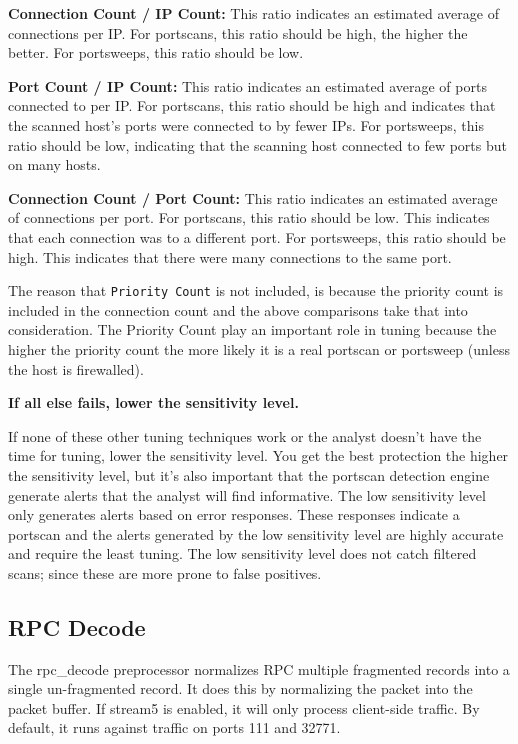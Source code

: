 \documentclass[english]{report}
\newcounter{slistnum}
\newenvironment{slist}
{ \begin{list}{ {\bf \arabic{slistnum}.} }{\usecounter{slistnum} } }
{ \end{list} }
\begin{document}
\begin{slist}
\textbf{Connection Count / IP Count:}  This ratio indicates an estimated
average of connections per IP.  For portscans, this ratio should be high, the
higher the better.  For portsweeps, this ratio should be low.
     
\textbf{Port Count / IP Count:}  This ratio indicates an estimated average of
ports connected to per IP.  For portscans, this ratio should be high and
indicates that the scanned host's ports were connected to by fewer IPs.  For
portsweeps, this ratio should be low, indicating that the scanning host
connected to few ports but on many hosts.
     
\textbf{Connection Count / Port Count:}  This ratio indicates an estimated
average of connections per port.  For portscans, this ratio should be low.
This indicates that each connection was to a different port.  For portsweeps,
this ratio should be high.  This indicates that there were many connections to
the same port.
     
The reason that \texttt{Priority Count} is not included, is because the
priority count is included in the connection count and the above comparisons
take that into consideration.  The Priority Count play an important role in
tuning because the higher the priority count the more likely it is a real
portscan or portsweep (unless the host is firewalled).
     
\item \textbf{If all else fails, lower the sensitivity level.}
     
If none of these other tuning techniques work or the analyst doesn't have the
time for tuning, lower the sensitivity level.  You get the best protection the
higher the sensitivity level, but it's also important that the portscan
detection engine generate alerts that the analyst will find informative.  The
low sensitivity level only generates alerts based on error responses.  These
responses indicate a portscan and the alerts generated by the low sensitivity
level are highly accurate and require the least tuning.  The low sensitivity
level does not catch filtered scans; since these are more prone to false
positives.  \end{slist}

\subsection{RPC Decode}
\label{sub:rpc-decoder}

The rpc\_decode preprocessor normalizes RPC multiple fragmented records into a
single un-fragmented record.  It does this by normalizing the packet into the
packet buffer.  If stream5 is enabled, it will only process client-side
traffic.  By default, it runs against traffic on ports 111 and 32771.
\end{document}
